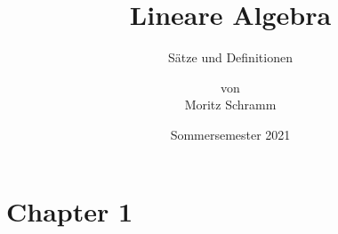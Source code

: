 \documentclass[a4paper, 12pt]{report}
\institute{Universität Bayreuth}
\title{Lineare Algebra}
\subtitle{Sätze und Definitionen}
\author{von\\Moritz Schramm}%
\date{Sommersemester 2021}
\begin{document}
	\maketitle
	\romantableofcontents
	
	\chapter{Chapter 1}
	
	
	
\end{document}
